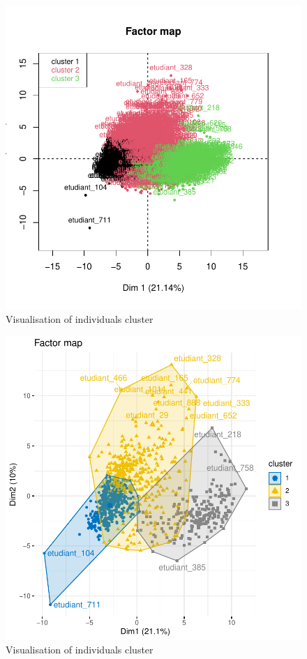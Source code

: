 \documentclass[12pt]{article}
\begin{document}
\begin{figure}[H]
\begin{center}
\includegraphics[scale=1.]{HCPC.pdf} 
\caption[]{Visualisation of  individuals cluster }
\end{center}
\end{figure}

\begin{figure}[H]
\begin{center}
\includegraphics[scale=1.]{HCPC_2.pdf} 
\caption[]{Visualisation of  individuals cluster }
\end{center}
\end{figure}
\end{document}
